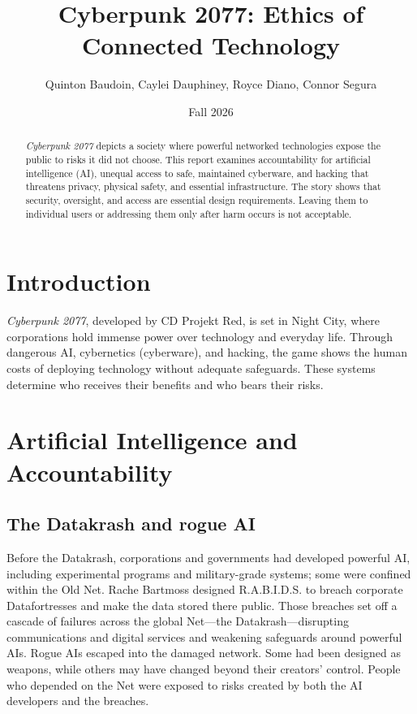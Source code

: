 \documentclass{article}%
\title{Cyberpunk 2077: Ethics of Connected Technology}
\author{Quinton Baudoin, Caylei Dauphiney, Royce Diano, Connor Segura}
\date{Fall 2026} %
\begin{document}
\maketitle
\nocite{Cyberpunk2077}

\begin{abstract}
\textit{Cyberpunk 2077} depicts a society where powerful networked technologies expose the public to risks it did not choose. This report examines accountability for artificial intelligence (AI), unequal access to safe, maintained cyberware, and hacking that threatens privacy, physical safety, and essential infrastructure. The story shows that security, oversight, and access are essential design requirements. Leaving them to individual users or addressing them only after harm occurs is not acceptable.
\end{abstract}

\section{Introduction}
\textit{Cyberpunk 2077}, developed by CD Projekt Red, is set in Night City, where corporations hold immense power over technology and everyday life. Through dangerous AI, cybernetics (cyberware), and hacking, the game shows the human costs of deploying technology without adequate safeguards. These systems determine who receives their benefits and who bears their risks.

\section{Artificial Intelligence and Accountability}
\subsection{The Datakrash and rogue AI}
Before the Datakrash, corporations and governments had developed powerful AI, including experimental programs and military-grade systems; some were confined within the Old Net. Rache Bartmoss designed R.A.B.I.D.S. to breach corporate Datafortresses and make the data stored there public. Those breaches set off a cascade of failures across the global Net—the Datakrash—disrupting communications and digital services and weakening safeguards around powerful AIs. Rogue AIs escaped into the damaged network. Some had been designed as weapons, while others may have changed beyond their creators' control. People who depended on the Net were exposed to risks created by both the AI developers and the breaches.
\end{document}
